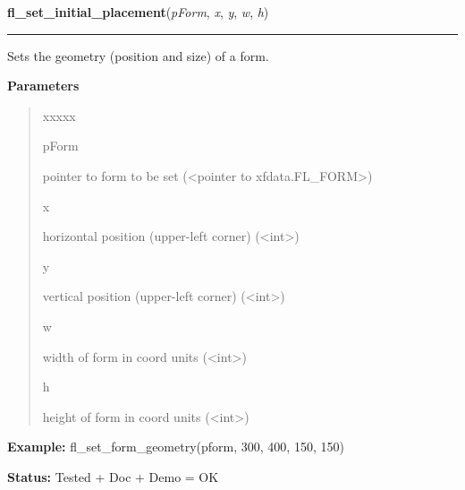     \label{xformslib:library:fl_set_form_geometry}

    \vspace{0.5ex}

\hspace{.8\funcindent}\begin{boxedminipage}{\funcwidth}

    \raggedright \textbf{fl\_set\_initial\_placement}(\textit{pForm}, \textit{x}, \textit{y}, \textit{w}, \textit{h})

    \vspace{-1.5ex}

    \rule{\textwidth}{0.5\fboxrule}
\setlength{\parskip}{2ex}
    Sets the geometry (position and size) of a form.

\setlength{\parskip}{1ex}
      \textbf{Parameters}
      \vspace{-1ex}

      \begin{quote}
        \begin{Ventry}{xxxxx}

          \item[pForm]

          pointer to form to be set ({\textless}pointer to 
          xfdata.FL\_FORM{\textgreater})

          \item[x]

          horizontal position (upper-left corner) 
          ({\textless}int{\textgreater})

          \item[y]

          vertical position (upper-left corner) 
          ({\textless}int{\textgreater})

          \item[w]

          width of form in coord units ({\textless}int{\textgreater})

          \item[h]

          height of form in coord units ({\textless}int{\textgreater})

        \end{Ventry}

      \end{quote}

\textbf{Example:} fl\_set\_form\_geometry(pform, 300, 400, 150, 150)



\textbf{Status:} Tested + Doc + Demo = OK



    \end{boxedminipage}

